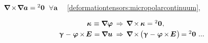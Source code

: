 \label{section:compatibilityequations.cosseratcontinuum}

 
${\boldnabla \hspace{-0.15ex} \times \hspace{-0.3ex} \boldnabla \bm{a} = {^2}\bm{0}}$~${\forall \bm{a}}$
~~\eqref{deformationtensors:micropolarcontinuum},

\nopagebreak\vspace{-0.8em}\begin{equation}
\begin{array}{r@{\hspace{1ex}}c@{\hspace{1ex}}l}
\wrynesstensor \hspace{.16ex} \equiv \boldnabla \fieldofrotations
& \hspace{.1ex} \Rightarrow &
\boldnabla \hspace{-0.15ex} \times \hspace{-0.1ex} \wrynesstensor \hspace{.1ex} = {^2}\bm{0}
\hspace{.1ex} ,
\\[.3em]
%
\distortiontensor \hspace{.1ex} - \hspace{.1ex} \fieldofrotations \hspace{-0.12ex} \times \hspace{-0.25ex} \UnitDyad \hspace{.12ex} = \hspace{-0.1ex} \boldnabla \fieldofdisplacements \hspace{.1ex}
& \hspace{.1ex} \Rightarrow &
\boldnabla \hspace{-0.15ex} \times \hspace{-0.2ex} \bigl(
\distortiontensor \hspace{.1ex} - \hspace{.1ex} \fieldofrotations \hspace{-0.12ex} \times \hspace{-0.25ex} \UnitDyad \hspace{.12ex}
\bigr) \hspace{-0.22ex}
= {^2}\bm{0}
\hspace{.8ex} ...
\end{array}
\end{equation}

